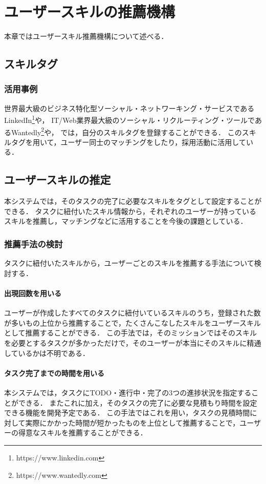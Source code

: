 \chapter{ユーザースキルの推薦機構}
本章ではユーザースキル推薦機構について述べる．

\section{スキルタグ}

\subsection{活用事例}
世界最大級のビジネス特化型ソーシャル・ネットワーキング・サービスであるLinkedIn\footnote{https://www.linkedin.com}や，
IT/Web業界最大級のソーシャル・リクルーティング・ツールであるWantedly\footnote{https://www.wantedly.com}や，
では，自分のスキルタグを登録することができる．
このスキルタグを用いて，ユーザー同士のマッチングをしたり，採用活動に活用している．

\section{ユーザースキルの推定}
本システムでは，そのタスクの完了に必要なスキルをタグとして設定することができる．
タスクに紐付いたスキル情報から，それぞれのユーザーが持っているスキルを推薦し，マッチングなどに活用することを今後の課題としている．

\subsection{推薦手法の検討}
タスクに紐付いたスキルから，ユーザーごとのスキルを推薦する手法について検討する．

\subsubsection{出現回数を用いる}
ユーザーが作成したすべてのタスクに紐付いているスキルのうち，登録された数が多いもの上位から推薦することで，たくさんこなしたスキルをユーザースキルとして推薦することができる．
この手法では，そのミッションではそのスキルを必要とするタスクが多かっただけで，そのユーザーが本当にそのスキルに精通しているかは不明である．

\subsubsection{タスク完了までの時間を用いる}
本システムでは，タスクにTODO・進行中・完了の3つの進捗状況を指定することができる．
またこれに加え，そのタスクの完了に必要な見積もり時間を設定できる機能を開発予定である．
この手法ではこれを用い，タスクの見積時間に対して実際にかかった時間が短かったものを上位として推薦することで，ユーザーの得意なスキルを推薦することができる．

